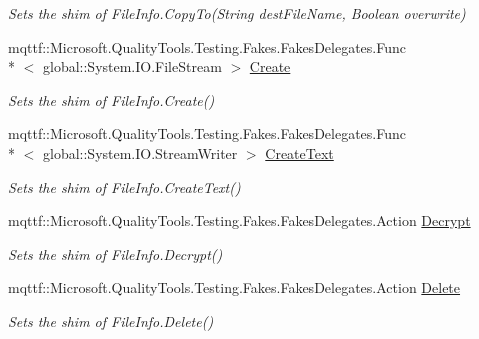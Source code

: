 \begin{DoxyCompactItemize}
\begin{DoxyCompactList}\small\item\em Sets the shim of File\-Info.\-Copy\-To(\-String dest\-File\-Name, Boolean overwrite)\end{DoxyCompactList}\item 
mqttf\-::\-Microsoft.\-Quality\-Tools.\-Testing.\-Fakes.\-Fakes\-Delegates.\-Func\\*
$<$ global\-::\-System.\-I\-O.\-File\-Stream $>$ \hyperlink{class_system_1_1_i_o_1_1_fakes_1_1_shim_file_info_a4c0b6336385df53fcc3783e180b1218a}{Create}
\begin{DoxyCompactList}\small\item\em Sets the shim of File\-Info.\-Create()\end{DoxyCompactList}\item 
mqttf\-::\-Microsoft.\-Quality\-Tools.\-Testing.\-Fakes.\-Fakes\-Delegates.\-Func\\*
$<$ global\-::\-System.\-I\-O.\-Stream\-Writer $>$ \hyperlink{class_system_1_1_i_o_1_1_fakes_1_1_shim_file_info_a813ab7d4ac151ed458e0cfbaff869c43}{Create\-Text}
\begin{DoxyCompactList}\small\item\em Sets the shim of File\-Info.\-Create\-Text()\end{DoxyCompactList}\item 
mqttf\-::\-Microsoft.\-Quality\-Tools.\-Testing.\-Fakes.\-Fakes\-Delegates.\-Action \hyperlink{class_system_1_1_i_o_1_1_fakes_1_1_shim_file_info_a53e2869347778976a8a067f86e90889c}{Decrypt}
\begin{DoxyCompactList}\small\item\em Sets the shim of File\-Info.\-Decrypt()\end{DoxyCompactList}\item 
mqttf\-::\-Microsoft.\-Quality\-Tools.\-Testing.\-Fakes.\-Fakes\-Delegates.\-Action \hyperlink{class_system_1_1_i_o_1_1_fakes_1_1_shim_file_info_a97001d675ebd5877d280b7e0d19183d6}{Delete}
\begin{DoxyCompactList}\small\item\em Sets the shim of File\-Info.\-Delete()\end{DoxyCompactList}\item 

\end{DoxyCompactItemize}
